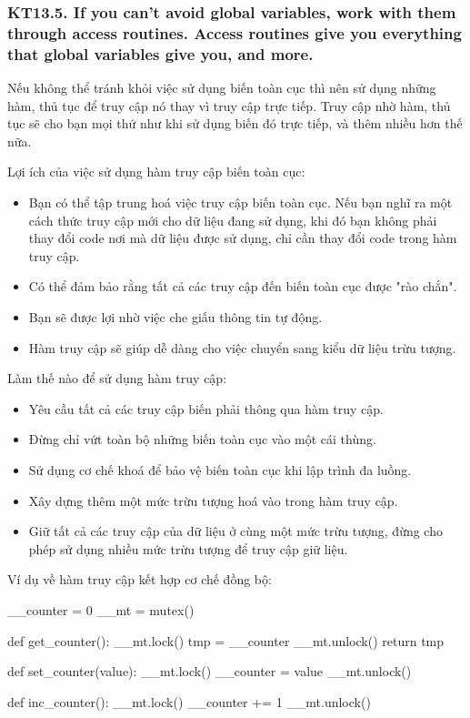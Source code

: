 \documentclass[12pt]{report}
\begin{document}
\subsubsection{KT13.5. If you can't avoid global variables, work with them through access routines. Access routines give you everything that global variables give you, and more.}
Nếu không thể tránh khỏi việc sử dụng biến toàn cục thì nên sử dụng những hàm, thủ tục để truy cập nó thay vì truy cập trực tiếp. 
Truy cập nhờ hàm, thủ tục sẽ cho bạn mọi thứ như khi sử dụng biến đó trực tiếp, và thêm nhiều hơn thế nữa. 
\vspace*{5mm}

\noindent Lợi ích của việc sử dụng hàm truy cập biến toàn cục: 
\begin{itemize}
	\item Bạn có thể tập trung hoá việc truy cập biến toàn cục. Nếu bạn nghĩ ra một cách thức truy cập mới cho dữ liệu đang sử dụng, khi đó bạn không phải thay đổi code nơi mà dữ liệu được sử dụng, chỉ cần thay đổi code trong hàm truy cập. 
	\item Có thể đảm bảo rằng tất cả các truy cập đến biến toàn cục được "rào chắn".
	\item Bạn sẽ được lợi nhờ việc che giấu thông tin tự động. 
	\item Hàm truy cập sẽ giúp dễ dàng cho việc chuyển sang kiểu dữ liệu trừu tượng. 
\end{itemize}

\noindent Làm thế nào để sử dụng hàm truy cập:
\begin{itemize}
	\item Yêu cầu tất cả các truy cập biến phải thông qua hàm truy cập.
	\item Đừng chỉ vứt toàn bộ những biến toàn cục vào một cái thùng. 
	\item Sử dụng cơ chế khoá để bảo vệ biến toàn cục khi lập trình đa luồng. 
	\item Xây dựng thêm một mức trừu tượng hoá vào trong hàm truy cập. 
	\item Giữ tất cả các truy cập của dữ liệu ở cùng một mức trừu tượng, đừng cho phép sử dụng nhiều mức trừu tượng để truy cập giữ liệu. 
\end{itemize}
Ví dụ về hàm truy cập kết hợp cơ chế đồng bộ:
\begin{python}
__counter = 0
__mt = mutex()

def get_counter():
	__mt.lock()
	tmp = __counter
	__mt.unlock()
	return tmp

def set_counter(value):
	__mt.lock()
	__counter = value
	__mt.unlock()
	
def inc_counter():
	__mt.lock()
	__counter += 1
	__mt.unlock()

\end{python}
\end{document}
